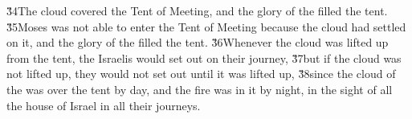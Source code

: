 \v{34}The cloud covered the Tent of Meeting, and the glory of the  filled the tent. \v{35}Moses was not able to enter the Tent of Meeting because the cloud had settled on it, and the glory of the  filled the tent. \v{36}Whenever the cloud was lifted up from the tent, the Israelis would set out on their journey, \v{37}but if the cloud was not lifted up, they would not set out until it was lifted up, \v{38}since the cloud of the  was over the tent by day, and the fire was in it by night, in the sight of all the house of Israel in all their journeys.
